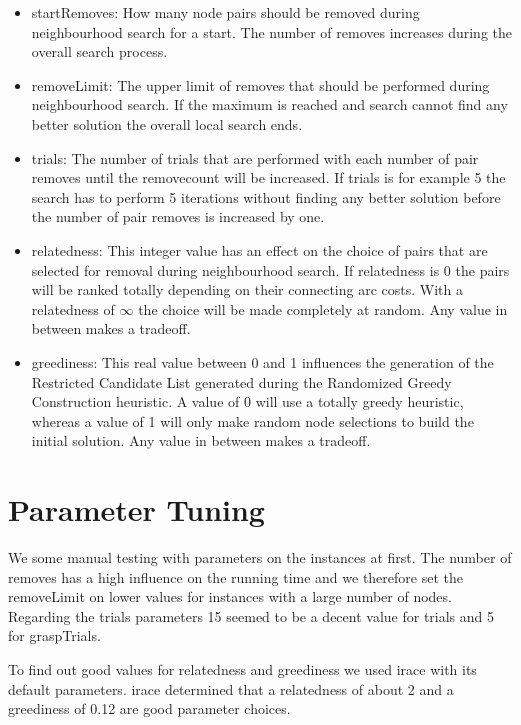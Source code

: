 \documentclass[a4paper]{scrartcl}
\begin{document}
\begin{itemize}
  \item startRemoves: How many node pairs should be removed during neighbourhood search for a start. The number of removes increases during the overall search process.
  \item removeLimit: The upper limit of removes that should be performed during neighbourhood search. If the maximum is reached and search cannot find any better solution the overall local search ends.

  \item trials: The number of trials that are performed with each number of pair removes until the removecount will be increased. If trials is for example 5 the search has to perform 5 iterations without finding any better solution before the number of pair removes is increased by one.

  \item relatedness: This integer value has an effect on the choice of pairs that are selected for removal during neighbourhood search. If relatedness is 0 the pairs will be ranked totally depending on their connecting arc costs. With a relatedness of $\infty$ the choice will be made completely at random. Any value in between makes a tradeoff.

  \item greediness: This real value between 0 and 1 influences the generation of the Restricted Candidate List generated during the Randomized Greedy Construction heuristic. A value of 0 will use a totally greedy heuristic, whereas a value of 1 will only make random node selections to build the initial solution. Any value in between makes a tradeoff.
\end{itemize}

\section{Parameter Tuning}
We some manual testing with parameters on the instances at first. The number of removes has a high influence on the running time and we therefore set the removeLimit on lower values for instances with a large number of nodes. Regarding the trials parameters 15 seemed to be a decent value for trials and 5 for graspTrials.

To find out good values for relatedness and greediness we used irace \cite{lopez2011irace} with its default parameters. irace determined that a relatedness of about 2 and a greediness of 0.12 are good parameter choices.
\end{document}
